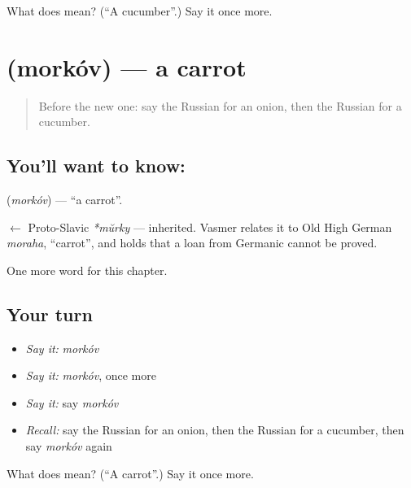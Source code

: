 \begin{tcolorbox}[breakable,colback=teal!4,colframe=teal!35!black,title={Before you move on}]
What does  mean? (\textquotedblleft{}A cucumber\textquotedblright{}.) Say it once more.
\end{tcolorbox}
\section[\texorpdfstring{\ru{морковь} (morkóv)}{морковь (morkóv)}]{ (morkóv) — a carrot}

\label{lesson:RU-C45-carrot}



\begin{quote}
Before the new one: say the Russian for an onion, then the Russian for a cucumber.
\end{quote}

\subsection*{You'll want to know: }
\textbf{} (\emph{morkóv}) — \textquotedblleft{}a carrot\textquotedblright{}.

\begin{cousinweb}
\textbf{} $\leftarrow$ Proto-Slavic \emph{*mŭrky} — inherited. Vasmer relates it to Old High German \emph{moraha}, \textquotedblleft{}carrot\textquotedblright{}, and holds that a loan from Germanic cannot be proved.
\end{cousinweb}

\begin{grammarlens}[title={What you've built}]
One more word for this chapter.
\end{grammarlens}

\subsection*{Your turn}
\begin{itemize}
\raggedright
  \item \emph{Say it:} \emph{morkóv}
  \item \emph{Say it:} \emph{morkóv}, once more
  \item \emph{Say it:} say \emph{morkóv}
  \item \emph{Recall:} say the Russian for an onion, then the Russian for a cucumber, then say \emph{morkóv} again
\end{itemize}

\begin{tcolorbox}[breakable,colback=teal!4,colframe=teal!35!black,title={Before you move on}]
What does  mean? (\textquotedblleft{}A carrot\textquotedblright{}.) Say it once more.
\end{tcolorbox}
